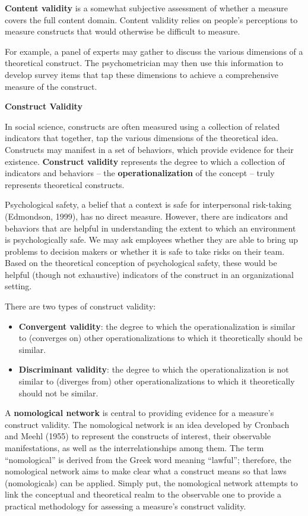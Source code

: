 \documentclass[
]{book}
\providecommand{\tightlist}{%
  \setlength{\itemsep}{0pt}\setlength{\parskip}{0pt}}
\begin{document}
\textbf{Content validity} is a somewhat subjective assessment of whether a measure covers the full content domain. Content validity relies on people's perceptions to measure constructs that would otherwise be difficult to measure.

For example, a panel of experts may gather to discuss the various dimensions of a theoretical construct. The psychometrician may then use this information to develop survey items that tap these dimensions to achieve a comprehensive measure of the construct.

\textbf{Construct Validity}

In social science, constructs are often measured using a collection of related indicators that together, tap the various dimensions of the theoretical idea. Constructs may manifest in a set of behaviors, which provide evidence for their existence. \textbf{Construct validity} represents the degree to which a collection of indicators and behaviors -- the \textbf{operationalization} of the concept -- truly represents theoretical constructs.

Psychological safety, a belief that a context is safe for interpersonal risk-taking (Edmondson, 1999), has no direct measure. However, there are indicators and behaviors that are helpful in understanding the extent to which an environment is psychologically safe. We may ask employees whether they are able to bring up problems to decision makers or whether it is safe to take risks on their team. Based on the theoretical conception of psychological safety, these would be helpful (though not exhaustive) indicators of the construct in an organizational setting.

There are two types of construct validity:

\begin{itemize}
\tightlist
\item
  \textbf{Convergent validity}: the degree to which the operationalization is similar to (converges on) other operationalizations to which it theoretically should be similar.
\item
  \textbf{Discriminant validity}: the degree to which the operationalization is not similar to (diverges from) other operationalizations to which it theoretically should not be similar.
\end{itemize}

A \textbf{nomological network} is central to providing evidence for a measure's construct validity. The nomological network is an idea developed by Cronbach and Meehl (1955) to represent the constructs of interest, their observable manifestations, as well as the interrelationships among them. The term ``nomological'' is derived from the Greek word meaning ``lawful''; therefore, the nomological network aims to make clear what a construct means so that laws (nomologicals) can be applied. Simply put, the nomological network attempts to link the conceptual and theoretical realm to the observable one to provide a practical methodology for assessing a measure's construct validity.
\end{document}
